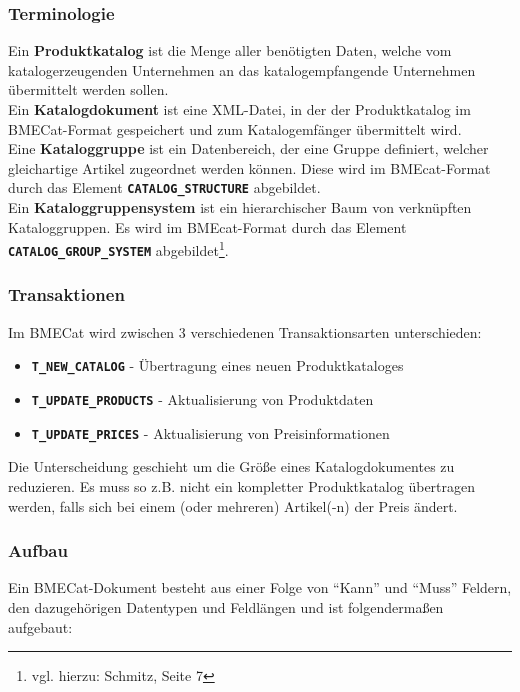 	\subsubsection{Terminologie}
	Ein \textbf{Produktkatalog} ist die Menge aller benötigten Daten, welche vom katalogerzeugenden Unternehmen an das katalogempfangende Unternehmen übermittelt werden sollen.\\
	Ein \textbf{Katalogdokument} ist eine XML-Datei, in der der Produktkatalog im BMECat-Format gespeichert und zum Katalogemfänger übermittelt wird.\\
	Eine \textbf{Kataloggruppe} ist ein Datenbereich, der eine Gruppe definiert, welcher gleichartige Artikel zugeordnet werden können. Diese wird im BMEcat-Format durch das Element \texttt{\textbf{CATALOG\_STRUCTURE}} abgebildet.\\
	Ein \textbf{Kataloggruppensystem} ist ein hierarchischer Baum von verknüpften Kataloggruppen. Es wird
	im BMEcat-Format durch das Element \texttt{\textbf{CATALOG\_GROUP\_SYSTEM}} abgebildet\footnote{vgl. hierzu: Schmitz, Seite 7}.
	
	\subsubsection{Transaktionen}
	Im BMECat wird zwischen 3 verschiedenen Transaktionsarten unterschieden:
	\begin{itemize}[noitemsep]
	\item \texttt{\textbf{T\_NEW\_CATALOG}} - Übertragung eines neuen Produktkataloges
	\item \texttt{\textbf{T\_UPDATE\_PRODUCTS}} - Aktualisierung von Produktdaten
	\item \texttt{\textbf{T\_UPDATE\_PRICES}} - Aktualisierung von Preisinformationen
	\end{itemize} 
	Die Unterscheidung geschieht um die Größe eines Katalogdokumentes zu reduzieren. Es muss so z.B. nicht ein kompletter Produktkatalog übertragen werden, falls sich bei einem (oder mehreren) Artikel(-n) der Preis ändert. %
	\pagebreak
	\subsubsection{Aufbau}
	
	Ein BMECat-Dokument besteht aus einer Folge von \enquote{Kann} und \enquote{Muss} Feldern, den dazugehörigen Datentypen und Feldlängen und ist folgendermaßen aufgebaut:
		
